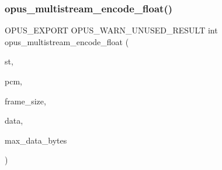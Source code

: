 \subsubsection{\texorpdfstring{opus\+\_\+multistream\+\_\+encode\+\_\+float()}{opus\_multistream\_encode\_float()}}
{\footnotesize\ttfamily O\+P\+U\+S\+\_\+\+E\+X\+P\+O\+RT O\+P\+U\+S\+\_\+\+W\+A\+R\+N\+\_\+\+U\+N\+U\+S\+E\+D\+\_\+\+R\+E\+S\+U\+LT int opus\+\_\+multistream\+\_\+encode\+\_\+float (\begin{DoxyParamCaption}\item[{\hyperlink{group__opus__multistream_gae5826674d142fc873ebc1d781c507dd7}{Opus\+M\+S\+Encoder} $\ast$}]{st,  }\item[{\hyperlink{zconf_8h_a2c212835823e3c54a8ab6d95c652660e}{const} float $\ast$}]{pcm,  }\item[{int}]{frame\+\_\+size,  }\item[{unsigned char $\ast$}]{data,  }\item[{\hyperlink{opus__types_8h_aa4d309d6f80b99dbabebc8f98879ab9a}{opus\+\_\+int32}}]{max\+\_\+data\+\_\+bytes }\end{DoxyParamCaption})}

